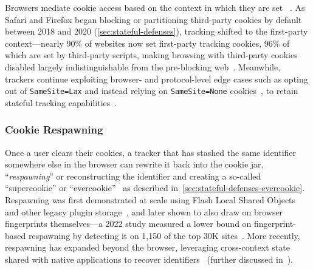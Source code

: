 Browsers mediate cookie access based on the context in which they are set
~\cite{beugin2024WebAlmanac2024,singhIncoherenciesWebBrowser2010,mdnSameoriginPolicySecurity2024}.
%
As Safari and Firefox began blocking or partitioning third-party cookies by default~\cite{TrackingPreventionWebKit2020,mdnThirdpartyCookiesPrivacy2024}  between 2018 and 2020 (\autoref{sec:stateful-defenses}), tracking shifted to the first-party context---nearly 90\% of websites now set first-party tracking cookies, 96\% of which are set by third-party scripts, making browsing with third-party cookies disabled largely indistinguishable from the pre-blocking web~\cite{munirCookieGraphUnderstandingDetecting2023,vekaria2024WebAlmanac2024,linBrowsingThirdPartyCookies2024}.
%
Meanwhile, trackers continue exploiting browser- and protocol-level edge cases such as opting out of \texttt{SameSite=Lax} and instead relying on \texttt{SameSite=None} cookies~\cite{khodayariStateSameSiteStudying2022}, to retain stateful tracking capabilities~\cite{bashirHowTrackingCompanies2018}.


\subsubsection{Cookie Respawning}
\label{sec:stateful-techniques-cookie-respawning}
Once a user clears their cookies, a tracker that has stashed the same identifier somewhere else in the browser can rewrite it back into the cookie jar, ``\textit{respawning}'' or reconstructing the identifier and creating a so-called ``supercookie'' or ``evercookie''~\cite{ayensonFlashCookiesPrivacy2011,soltaniFlashCookiesPrivacy2009,acarWebNeverForgets2014} as described in~\autoref{sec:stateful-defenses-evercookie}.
%
Respawning was first demonstrated at scale using Flash Local Shared Objects and other legacy plugin storage~\cite{acarWebNeverForgets2014,englehardtOnlineTracking1millionsite2016}, and later shown to also draw on browser fingerprints themselves---a 2022 study measured a lower bound on fingerprint-based respawning by detecting it on 1,150 of the top 30K sites~\cite{fouadMyCookiePhoenix2022}.
%
More recently, respawning has expanded beyond the browser, leveraging cross-context state shared with native applications to recover identifiers~\cite{wessels2025hytrack} (further discussed in~).



